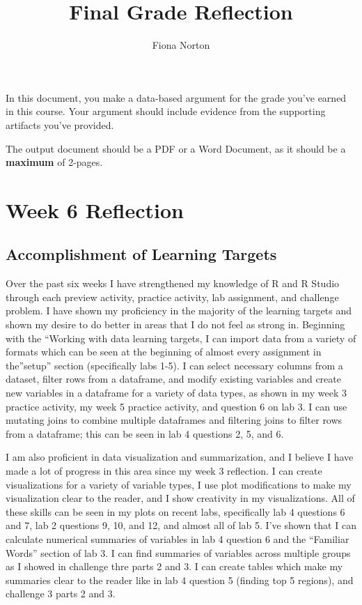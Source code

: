 \documentclass[
  letterpaper,
  DIV=11,
  numbers=noendperiod]{scrartcl}
\title{Final Grade Reflection}
\author{Fiona Norton}
\date{}
\begin{document}
\maketitle
\ifdefined\Shaded\renewenvironment{Shaded}{\begin{tcolorbox}[boxrule=0pt, frame hidden, interior hidden, breakable, enhanced, sharp corners, borderline west={3pt}{0pt}{shadecolor}]}{\end{tcolorbox}}\fi

In this document, you make a data-based argument for the grade you've
earned in this course. Your argument should include evidence from the
supporting artifacts you've provided.

The output document should be a PDF or a Word Document, as it should be
a \textbf{maximum} of 2-pages.

\hypertarget{week-6-reflection}{%
\section{Week 6 Reflection}\label{week-6-reflection}}

\hypertarget{accomplishment-of-learning-targets}{%
\subsection{Accomplishment of Learning
Targets}\label{accomplishment-of-learning-targets}}

Over the past six weeks I have strengthened my knowledge of R and R
Studio through each preview activity, practice activity, lab assignment,
and challenge problem. I have shown my proficiency in the majority of
the learning targets and shown my desire to do better in areas that I do
not feel as strong in. Beginning with the ``Working with data learning
targets, I can import data from a variety of formats which can be seen
at the beginning of almost every assignment in the''setup'' section
(specifically labs 1-5). I can select necessary columns from a dataset,
filter rows from a dataframe, and modify existing variables and create
new variables in a dataframe for a variety of data types, as shown in my
week 3 practice activity, my week 5 practice activity, and question 6 on
lab 3. I can use mutating joins to combine multiple dataframes and
filtering joins to filter rows from a dataframe; this can be seen in lab
4 questions 2, 5, and 6.

I am also proficient in data visualization and summarization, and I
believe I have made a lot of progress in this area since my week 3
reflection. I can create visualizations for a variety of variable types,
I use plot modifications to make my visualization clear to the reader,
and I show creativity in my visualizations. All of these skills can be
seen in my plots on recent labs, specifically lab 4 questions 6 and 7,
lab 2 questions 9, 10, and 12, and almost all of lab 5. I've shown that
I can calculate numerical summaries of variables in lab 4 question 6 and
the ``Familiar Words'' section of lab 3. I can find summaries of
variables across multiple groups as I showed in challenge thre parts 2
and 3. I can create tables which make my summaries clear to the reader
like in lab 4 question 5 (finding top 5 regions), and challenge 3 parts
2 and 3.
\end{document}
